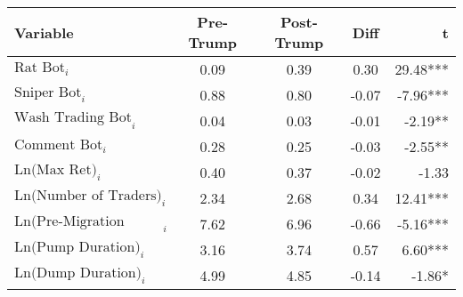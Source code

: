 \begin{tabular}{lcccr}
\toprule
Variable & Pre-Trump & Post-Trump & Diff & t \\
\midrule
$\text{Rat Bot}_{i}$ & 0.09 & 0.39 & 0.30 & 29.48*** \\
$\text{Sniper Bot}_{i}$ & 0.88 & 0.80 & -0.07 & -7.96*** \\
$\text{Wash Trading Bot}_{i}$ & 0.04 & 0.03 & -0.01 & -2.19** \\
$\text{Comment Bot}_{i}$ & 0.28 & 0.25 & -0.03 & -2.55** \\
$\text{Ln(Max Ret)}_{i}$ & 0.40 & 0.37 & -0.02 & -1.33 \\
$\text{Ln(Number of Traders)}_{i}$ & 2.34 & 2.68 & 0.34 & 12.41*** \\
$\text{Ln(Pre-Migration Duration)}_{i}$ & 7.62 & 6.96 & -0.66 & -5.16*** \\
$\text{Ln(Pump Duration)}_{i}$ & 3.16 & 3.74 & 0.57 & 6.60*** \\
$\text{Ln(Dump Duration)}_{i}$ & 4.99 & 4.85 & -0.14 & -1.86* \\
\bottomrule
\end{tabular}